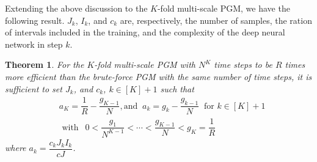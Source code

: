 \documentclass{article}
\newtheorem{theorem}{Theorem}[section]
\numberwithin{equation}{section}
\begin{document}
Extending the above discussion to the $K$-fold multi-scale PGM, we have the following result. $J_k$, $I_k$, and $c_k$ are, respectively, the number of samples, the ration of intervals included in the training, and the complexity of the deep neural network in step $k$.
\begin{theorem}\label{thm:management}
For the $K$-fold multi-scale PGM with $N^K$ time steps to be $R$ times more efficient than the brute-force PGM with the same number of time steps, it is sufficient to set $J_k$, and $c_k$, $k\in[K]+1$ such that    
\begin{equation}
    \begin{split}
        &a_K=\dfrac{1}{R}-\dfrac{g_{K-1}}{N}, \text{and }~
    a_k=g_{k}-\dfrac{g_{k-1}}{N}~\text{ for }k\in[K]+1\\
    &\text{ with }~~ 0<\dfrac{g_{1}}{N^{K-1}}<\cdots<\dfrac{g_{K-1}}{N}<g_K=\dfrac{1}{R}
    \end{split}
\end{equation}
where $a_k=\dfrac{c_{k}J_{k}I_{k}}{cJ}$.
\end{theorem}
\end{document}
